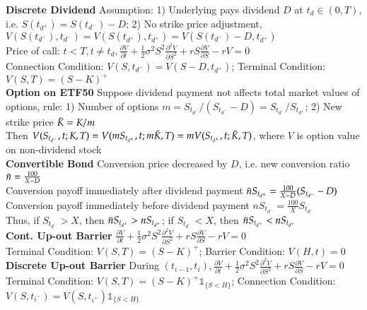 \documentclass[12pt,landscape, a4paper]{article}
\theoremstyle{remark}
\newcommand{\dd}{\partial}
\begin{document}
\begin{multicols*}{3}
\textbf{Discrete Dividend} Assumption: 1) Underlying pays dividend $D$ at $t_d \in (0, T)$, i.e. $S (t_{d^+}) = S (t_{d^-}) - D$; 2) No strike price adjustment, $V(S (t_{d^-}), t_{d^-} ) = V(S (t_{d^+}), t_{d^+} ) = V(S (t_{d^-}) - D, t_{d^+} )$\\
Price of call: $t<T, t\neq t_d, \frac{\dd V}{\dd t} + \frac{1}{2} \sigma^2 S^2 \frac{\dd^2 V}{\dd S^2} + rS \frac{\dd V}{\dd S} - rV = 0$\\
Connection Condition: $V(S, t_{d^-} ) = V(S-D, t_{d^+})$; Terminal Condition: $V(S, T) = (S-K)^+$\\

\textbf{Option on ETF50} Suppose dividend payment not affects total market values of options, rule: 1) Number of options $m = S_{t_{d^-}} / (S_{t_{d^-}} - D) = S_{t_{d^-}} / S_{t_{d^+}}$; 2) New strike price $\Bar{K} = K/m$\\
Then $V(S_{t_{d^-}}, t; K, T) = V (m S_{t_{d^+}} , t; m \Bar{K}, T ) = m V (S_{t_{d^+}} , t; \Bar{K}, T ) $, where $V$ is option value on non-dividend stock\\

\textbf{Convertible Bond} Conversion price decreased by $D$, i.e. new conversion ratio $\Bar{n} = \frac{100}{X-D}$\\
Conversion payoff immediately after dividend payment $\Bar{n} S_{t_{d^+}} = \frac{100}{X - D} (S_{t_{d^-}} - D)$\\
Conversion payoff immediately before dividend payment $n S_{t_{d^-}} = \frac{100}{X} S_{t_{d^-}}$\\
Thus, if $S_{t_{d^-}} >X$, then $\Bar{n} S_{t_{d^+}} > n S_{t_{d^+}}$; if $S_{t_{d^-}} <X$, then $\Bar{n} S_{t_{d^+}} < n S_{t_{d^+}}$\\

\textbf{Cont. Up-out Barrier} $\frac{\dd V}{\dd t}+ \frac{1}{2} \sigma^2 S^2 \frac{\dd^2 V}{\dd S^2} + rS \frac{\dd V}{\dd S} -rV = 0 $\\
Terminal Condition: $V(S, T) = (S-K)^+$; Barrier Condition: $V(H, t) = 0$\\

\textbf{Discrete Up-out Barrier} During $(t_{i-1}, t_i), \frac{\dd V}{\dd t}+ \frac{1}{2} \sigma^2 S^2 \frac{\dd^2 V}{\dd S^2} + rS \frac{\dd V}{\dd S} -rV = 0 $\\
Terminal Condition: $V(S, T) = (S-K)^+ \mathds{1}_{\{S<H\}}$; Connection Condition: $V (S, t_{i^-}) = V (S, t_{i^+})\mathds{1}_{\{S<H\}}$\\


\end{multicols*}
\end{document}

